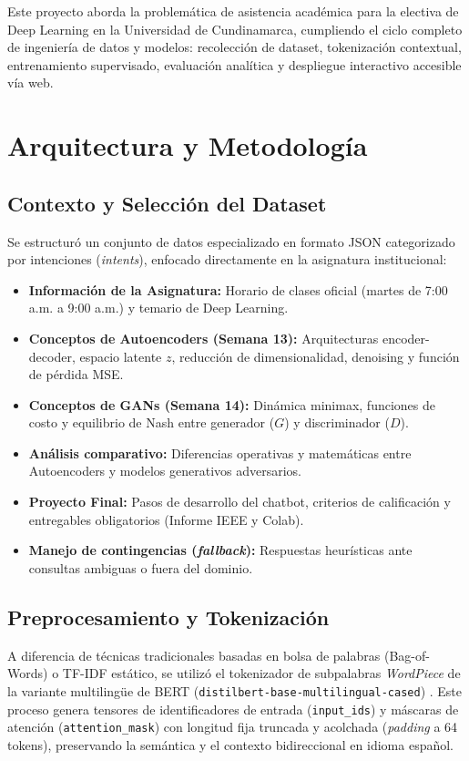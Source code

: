 \documentclass[conference]{IEEEtran}
\begin{document}
Este proyecto aborda la problemática de asistencia académica para la electiva de Deep Learning en la Universidad de Cundinamarca, cumpliendo el ciclo completo de ingeniería de datos y modelos: recolección de dataset, tokenización contextual, entrenamiento supervisado, evaluación analítica y despliegue interactivo accesible vía web.

\section{Arquitectura y Metodología}

\subsection{Contexto y Selección del Dataset}
Se estructuró un conjunto de datos especializado en formato JSON categorizado por intenciones (\textit{intents}), enfocado directamente en la asignatura institucional:
\begin{itemize}
    \item \textbf{Información de la Asignatura:} Horario de clases oficial (martes de 7:00 a.m. a 9:00 a.m.) y temario de Deep Learning.
    \item \textbf{Conceptos de Autoencoders (Semana 13):} Arquitecturas encoder-decoder, espacio latente $z$, reducción de dimensionalidad, denoising y función de pérdida MSE.
    \item \textbf{Conceptos de GANs (Semana 14):} Dinámica minimax, funciones de costo y equilibrio de Nash entre generador ($G$) y discriminador ($D$).
    \item \textbf{Análisis comparativo:} Diferencias operativas y matemáticas entre Autoencoders y modelos generativos adversarios.
    \item \textbf{Proyecto Final:} Pasos de desarrollo del chatbot, criterios de calificación y entregables obligatorios (Informe IEEE y Colab).
    \item \textbf{Manejo de contingencias (\textit{fallback}):} Respuestas heurísticas ante consultas ambiguas o fuera del dominio.
\end{itemize}

\subsection{Preprocesamiento y Tokenización}
A diferencia de técnicas tradicionales basadas en bolsa de palabras (Bag-of-Words) o TF-IDF estático, se utilizó el tokenizador de subpalabras \textit{WordPiece} de la variante multilingüe de BERT (\texttt{distilbert-base-multilingual-cased}) \cite{devlin2019, sanh2019}. Este proceso genera tensores de identificadores de entrada (\texttt{input\_ids}) y máscaras de atención (\texttt{attention\_mask}) con longitud fija truncada y acolchada (\textit{padding} a 64 tokens), preservando la semántica y el contexto bidireccional en idioma español.
\end{document}
